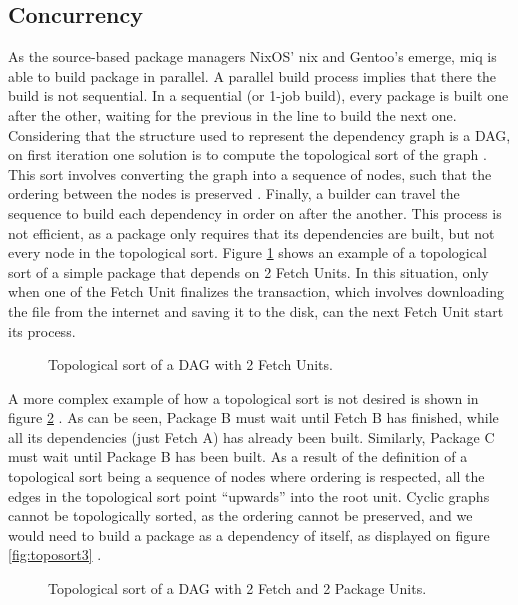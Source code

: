 \FloatBarrier
\subsection{Concurrency}
\label{sec:concurrency}

As the source-based package managers NixOS' nix and
Gentoo's emerge, miq is able to build package in parallel. A
parallel build process implies that there the build is not
sequential. In a sequential (or 1-job build), every package
is built one after the other, waiting for the previous in
the line to build the next one. Considering that the
structure used to represent the dependency graph is a
\acl{DAG}, on first iteration one solution is to compute the
topological sort of the graph
 . This sort
involves converting the graph into a sequence of nodes, such
that the ordering between the nodes is preserved
\cite{erParallelComputationApproach1983} . Finally, a
builder can travel the sequence to build each dependency in
order on after the another.
This process is not efficient, as a package only requires
that its dependencies are built, but not every node in the
topological sort. Figure \ref{fig:toposort} shows an example
of a topological sort of a simple package that depends on 2
Fetch Units. In this situation, only when one of the Fetch
Unit finalizes the transaction, which involves downloading
the file from the internet and saving it to the disk, can
the next Fetch Unit start its process.

\begin{figure}[hbtp]
    \centerfloat
    
    \caption{Topological sort of a \ac{DAG} with 2 Fetch Units.}
    \label{fig:toposort}
\end{figure}

A more complex example of how a topological sort is not
desired is shown in figure \ref{fig:toposort2} . As can be
seen, Package B must wait until Fetch B has finished, while
all its dependencies (just Fetch A) has already been built.
Similarly, Package C must wait until Package B has been
built. As a result of the definition of a topological sort
being a sequence of nodes where ordering is respected, all
the edges in the topological sort point ``upwards'' into the
root unit. Cyclic graphs cannot be topologically sorted, as
the ordering cannot be preserved, and we would need to build
a package as a dependency of itself, as displayed on figure
\ref{fig:toposort3} .

\begin{figure}[hbtp]
    \centerfloat
    
    \caption{Topological sort of a \ac{DAG} with 2 Fetch and
    2 Package Units.}
    \label{fig:toposort2}
\end{figure}

